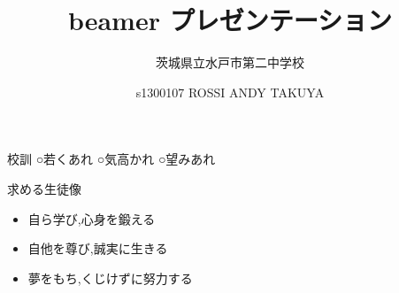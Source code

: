 \documentclass[platex,a4paper,12pt,dvipdfmx,aspectratio=169]{beamer}
\title{beamer プレゼンテーション}
\subtitle{茨城県立水戸市第二中学校}
\author{s1300107 ROSSI ANDY TAKUYA}
\institute{会津大学}
\begin{document}
\frame{
\titlepage
}



\begin{frame}{校訓}
○若くあれ
○気高かれ
○望みあれ

\end{frame}

\begin{frame}{求める生徒像}
\begin{itemize}
\item 自ら学び,心身を鍛える
\item 自他を尊び,誠実に生きる
\item 夢をもち,くじけずに努力する
\end{itemize}
\end{frame}
\end{document}
